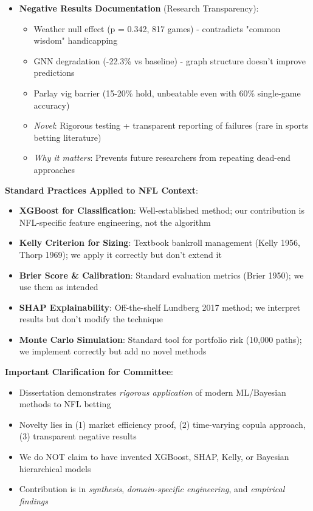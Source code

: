\begin{itemize}
  \item \textbf{Negative Results Documentation} (Research Transparency):
  \begin{itemize}
    \item Weather null effect (p = 0.342, 817 games) - contradicts "common wisdom" handicapping
    \item GNN degradation (-22.3\% vs baseline) - graph structure doesn't improve predictions
    \item Parlay vig barrier (15-20\% hold, unbeatable even with 60\% single-game accuracy)
    \item \textit{Novel}: Rigorous testing + transparent reporting of failures (rare in sports betting literature)
    \item \textit{Why it matters}: Prevents future researchers from repeating dead-end approaches
  \end{itemize}
\end{itemize}

\textbf{Standard Practices Applied to NFL Context}:

\begin{itemize}
  \item \textbf{XGBoost for Classification}: Well-established method; our contribution is NFL-specific feature engineering, not the algorithm
  \item \textbf{Kelly Criterion for Sizing}: Textbook bankroll management (Kelly 1956, Thorp 1969); we apply it correctly but don't extend it
  \item \textbf{Brier Score \& Calibration}: Standard evaluation metrics (Brier 1950); we use them as intended
  \item \textbf{SHAP Explainability}: Off-the-shelf Lundberg 2017 method; we interpret results but don't modify the technique
  \item \textbf{Monte Carlo Simulation}: Standard tool for portfolio risk (10,000 paths); we implement correctly but add no novel methods
\end{itemize}

\textbf{Important Clarification for Committee}:
\begin{itemize}
  \item Dissertation demonstrates \textit{rigorous application} of modern ML/Bayesian methods to NFL betting
  \item Novelty lies in (1) market efficiency proof, (2) time-varying copula approach, (3) transparent negative results
  \item We do NOT claim to have invented XGBoost, SHAP, Kelly, or Bayesian hierarchical models
  \item Contribution is in \textit{synthesis}, \textit{domain-specific engineering}, and \textit{empirical findings}
\end{itemize}

